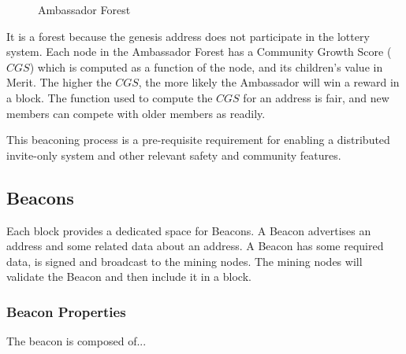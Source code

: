 \documentclass{article}
\begin{document}
\begin{figure}[H]
    \begin{center}
    \end{center}
    \caption{Ambassador Forest}

\end{figure}

It is a forest because the \gls{genesis address} does not participate in the lottery
system. Each node in the Ambassador Forest has a Community Growth Score ($CGS$)
which is computed as a function of the node, and its children's value in Merit.
The higher the $CGS$, the more likely the Ambassador will win a reward in a block.
The function used to compute the $CGS$ for an address is fair, and new members
can compete with older members as readily.

This beaconing process is a pre-requisite requirement for enabling a
distributed invite-only system and other relevant safety and community features.

\subsection{Beacons}

Each block provides a dedicated space for Beacons. A Beacon advertises an address
and some related data about an address. A Beacon has some required data,
is signed and broadcast to the mining nodes. The mining nodes will validate
the Beacon and then include it in a block.

\subsubsection{Beacon Properties}
The beacon is composed of...
\end{document}
